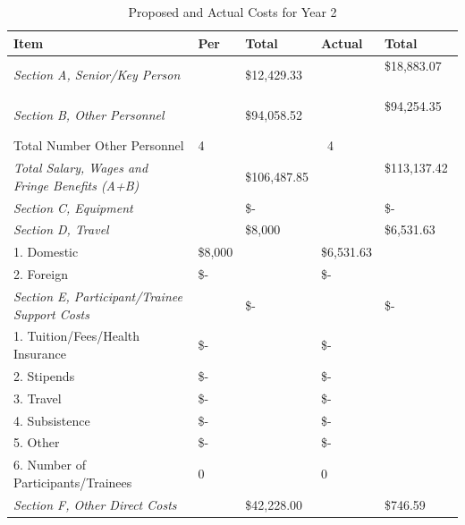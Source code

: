 \documentclass[12pt]{article}
\newcommand{\yr}{2}
\begin{document}
\begin{table}[h!]
\begin{center}
\caption{Proposed and Actual Costs for Year \yr}
\begin{tabular}{ | l | l | l | l | l | }
\hline
	\textbf{Item} & \textbf{Per} & \textbf{Total} & \textbf{Actual} & \textbf{Total}\\ \hline
	\textit{Section A, Senior/Key Person} & &  \$12,429.33  &  &  \$18,883.07  \  \\ \hline
	\textit{Section B, Other Personnel} & &  \$94,058.52  &  &  \$94,254.35 \  \\ \hline
	\hspace*{1 em}Total Number Other Personnel & 4 & & \ 4 & \    \\ \hline
	\textit{Total Salary, Wages and Fringe Benefits (A+B)} & & \$106,487.85  &  &  \$113,137.42 \  \\ \hline
	\textit{Section C, Equipment} &  &  \$-    & \ &  \$-     \\ \hline
	\textit{Section D, Travel} & &  \$8,000 & & \$6,531.63   \\ \hline
	\hspace*{1 em}1.  Domestic & \$8,000 & &  \$6,531.63 & \  \\ \hline
	\hspace*{1 em}2.  Foreign &  \$-  & \   &  \$-    & \   \\ \hline
	\textit{Section E, Participant/Trainee Support Costs} & \ &  \$-    & \  &  \$-       \\ \hline
	\hspace*{1 em}1.  Tuition/Fees/Health Insurance &   \$-  & \   &  \$-      \ & \\ \hline
	\hspace*{1 em}2.  Stipends &  \$-   & \ &  \$-    & \    \\ \hline
	\hspace*{1 em}3.  Travel &  \$-    & \ &  \$-    & \   \\ \hline
	\hspace*{1 em}4.  Subsistence &  \$-    & \ &  \$-     & \  \\ \hline
	\hspace*{1 em}5.  Other &  \$-    & \  &  \$-    & \  \\ \hline
	\hspace*{1 em}6.  Number of Participants/Trainees & 0 & \ & 0 & \   \\ \hline
	\textit{Section F, Other Direct Costs}& \ & \$42,228.00  &  &  \$746.59     \\ \hline

\end{tabular}
\end{center}
\end{table}
\end{document}
